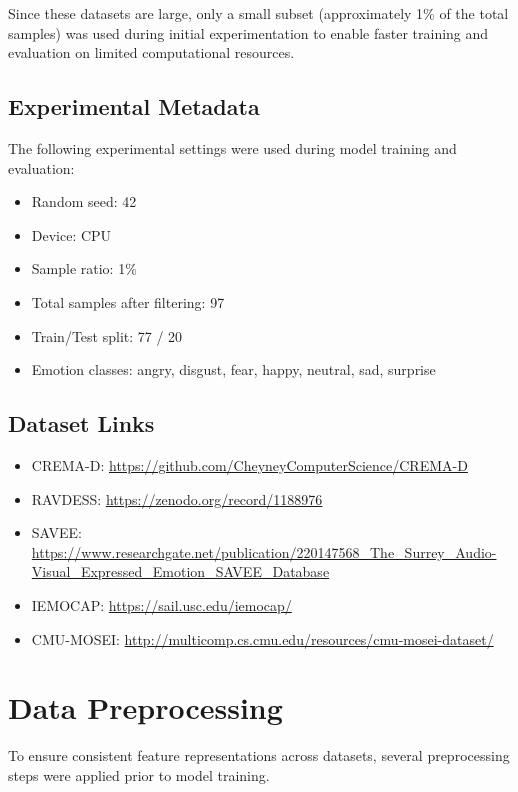 \documentclass[conference]{IEEEtran}
\begin{document}
Since these datasets are large, only a small subset (approximately 
1\% of the total samples) was used during initial experimentation to 
enable faster training and evaluation on limited computational 
resources.

\subsection{Experimental Metadata}

The following experimental settings were used during model training 
and evaluation:

\begin{itemize}
\item Random seed: 42
\item Device: CPU
\item Sample ratio: 1\%
\item Total samples after filtering: 97
\item Train/Test split: 77 / 20
\item Emotion classes: angry, disgust, fear, happy, neutral, sad, surprise
\end{itemize}

\subsection{Dataset Links}

\begin{itemize}
\item CREMA-D: \url{https://github.com/CheyneyComputerScience/CREMA-D}
\item RAVDESS: \url{https://zenodo.org/record/1188976}
\item SAVEE: \url{https://www.researchgate.net/publication/220147568_The_Surrey_Audio-Visual_Expressed_Emotion_SAVEE_Database}
\item IEMOCAP: \url{https://sail.usc.edu/iemocap/}
\item CMU-MOSEI: \url{http://multicomp.cs.cmu.edu/resources/cmu-mosei-dataset/}
\end{itemize}

\section{Data Preprocessing}

To ensure consistent feature representations across datasets, several 
preprocessing steps were applied prior to model training.
\end{document}
